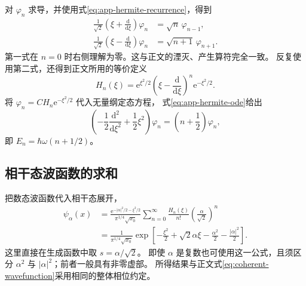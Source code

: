 对 $\varphi_n$ 求导，并使用式\eqref{eq:app-hermite-recurrence}，得到
\begin{align}
\frac{1}{\sqrt2}\left(\xi+\frac{\mathrm{d}}{\mathrm{d}\xi}\right)\varphi_n
&=\sqrt n\,\varphi_{n-1},\\
\frac{1}{\sqrt2}\left(\xi-\frac{\mathrm{d}}{\mathrm{d}\xi}\right)\varphi_n
&=\sqrt{n+1}\,\varphi_{n+1}.
\end{align}
第一式在 $n=0$ 时右侧理解为零。这与正文的湮灭、产生算符完全一致。
反复使用第二式，还得到正文所用的等价定义
\begin{equation}
H_n\left(\xi\right)=\mathrm{e}^{\xi^2/2}
\left(\xi-\frac{\mathrm{d}}{\mathrm{d}\xi}\right)^n\mathrm{e}^{-\xi^2/2}.
\end{equation}
将 $\varphi_n=CH_n\mathrm{e}^{-\xi^2/2}$ 代入无量纲定态方程，
式\eqref{eq:app-hermite-ode}给出
\begin{equation}
\left(-\frac12\frac{\mathrm{d}^2}{\mathrm{d}\xi^2}+\frac12\xi^2\right)\varphi_n
=\left(n+\frac12\right)\varphi_n,
\end{equation}
即 $E_n=\hbar\omega\left(n+1/2\right)$。

\subsection{相干态波函数的求和}
把数态波函数代入相干态展开，
\begin{align}
\psi_\alpha\left(x\right)
&=\frac{\mathrm{e}^{-\left|\alpha\right|^2/2-\xi^2/2}}{\pi^{1/4}\sqrt{x_0}}
\sum_{n=0}^{\infty}\frac{H_n\left(\xi\right)}{n!}
\left(\frac{\alpha}{\sqrt2}\right)^n\\
&=\frac{1}{\pi^{1/4}\sqrt{x_0}}
\exp\left[-\frac{\xi^2}{2}+\sqrt2\alpha\xi
-\frac{\alpha^2}{2}-\frac{\left|\alpha\right|^2}{2}\right].
\end{align}
这里直接在生成函数中取 $s=\alpha/\sqrt2$。
即使 $\alpha$ 是复数也可使用这一公式，且须区分 $\alpha^2$ 与
$\left|\alpha\right|^2$；前者一般具有非零虚部。
所得结果与正文式\eqref{eq:coherent-wavefunction}采用相同的整体相位约定。

